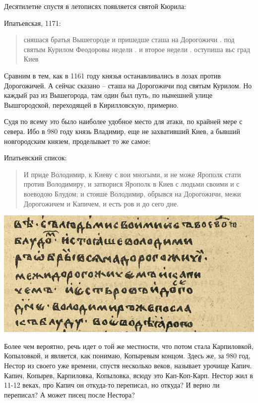 \documentclass[a5paper,11pt,openany]{article}
\begin{document}
Десятилетие спустя в летописях появляется святой Кюрила:

Ипатьевская, 1171:

\begin{quotation}
\noindent сняшася братья Вышегороде и пришедше сташа на Дорогожичи . под святым Курилом Феодоровы недели . и второе недели . оступиша вьс град Киев
\end{quotation}

Сравним в тем, как в 1161 году князья останавливались в лозах против Дорогожичей. А сейчас сказано – сташа на Дорогожичи под святым Курилом. Но каждый раз из Вышегорода, там один был путь, по нынешней улице Вышгородской, переходящей в Кирилловскую, примерно.

Судя по всему это было наиболее удобное место для атаки, по крайней мере с севера. Ибо в 980 году князь Владимир, еще не захвативший Киев, а бывший новгородским князем, проделывает то же самое:

Ипатьевский список:

\begin{quotation}
\noindent И приде Володимир, к Киеву с вои многыми, и не може Ярополк стати против Володимиру, и затворися Ярополк в Киев с людьми своими и с воеводою Блудом; и стояше Володимир, обрывся на Дорогожичи, межи Дорогожичем и Капичем, и есть ров и до сего дне.
\end{quotation}

\begin{center}
\includegraphics[width=\linewidth]{kapich.png}
\end{center}

Более чем вероятно, речь идет о той же местности, что потом стала Карпиловкой, Копыловкой, и является, как понимаю, Копыревым концом. Здесь же, за 980 год, Нестор из своего уже времени, спустя несколько веков, называет урочище Капич. Капич, Копырев, Карпиловка, Копыловка, всюду это Кап-Коп-Карп. Нестор жил в 11-12 веках, про Капич он откуда-то переписал, но откуда? И верно ли переписал? А может писец после Нестора?
\end{document}
